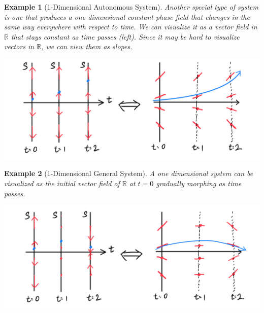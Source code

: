 \documentclass{article}
\newtheorem{example}{Example}[section]
\theoremstyle{remark}
\theoremstyle{definition}
\begin{document}
\begin{example}[1-Dimensional Autonomous System]
Another special type of system is one that produces a one dimensional \textit{constant} phase field that changes in the same way everywhere with respect to time. We can visualize it as a vector field in $\mathbb{R}$ that stays constant as time passes (left). Since it may be hard to visualize vectors in $\mathbb{R}$, we can view them as slopes. 
\begin{center}
    \includegraphics[scale=0.25]{img/One_dim_auto_system.PNG}
\end{center}
\end{example}

\begin{example}[1-Dimensional General System]
A one dimensional system can be visualized as the initial vector field of $\mathbb{R}$ at $t=0$ gradually morphing as time passes. 
\begin{center}
    \includegraphics[scale=0.25]{img/One_dim_general_system.PNG}
\end{center}
\end{example}
\end{document}

